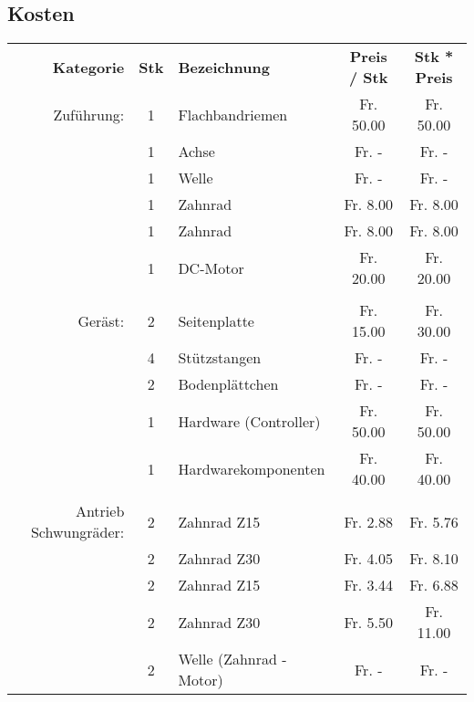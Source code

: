\subsection{Kosten}

\begin{table}[h!]

  \centering
 
    \begin{tabular}{rclcc}
    \textbf{Kategorie} & \textbf{Stk} & \textbf{Bezeichnung} & \textbf{Preis / Stk} & \textbf{Stk * Preis} \\

    Zuführung: & 1     & Flachbandriemen 	&  Fr. 50.00  &  Fr. 50.00  \\
               & 1     & Achse          	&  Fr. -      &  Fr. -    \\
               & 1     & Welle           	&  Fr. -      &  Fr. -    \\
               & 1     & Zahnrad         	&  Fr. 8.00   &  Fr. 8.00  \\
               & 1     & Zahnrad         	&  Fr. 8.00   &  Fr. 8.00  \\
               & 1     & DC-Motor        	&  Fr. 20.00  &  Fr. 20.00  \\
               &       &                 	&             &  \\
       Geräst: & 2     & Seitenplatte    	&  Fr. 15.00  &  Fr. 30.00  \\
               & 4     & Stützstangen    	&  Fr. -      &  Fr. -    \\
               & 2     & Bodenplättchen  	&  Fr. -      &  Fr. -    \\
               & 1     & Hardware (Controller) &  Fr. 50.00  &  Fr. 50.00  \\
               & 1     & Hardwarekomponenten&  Fr. 40.00  &  Fr. 40.00  \\
               &       &       				&      		  &  \\
Antrieb Schwungräder:  & 2    & Zahnrad Z15 &  Fr. 2.88   &  Fr. 5.76  \\
               & 2     & Zahnrad Z30 		&  Fr.          4.05  &  Fr. 8.10  \\
               & 2     & Zahnrad Z15 		&  Fr.          3.44  &  Fr. 6.88  \\
               & 2     & Zahnrad Z30 		&  Fr.          5.50  &  Fr. 11.00  \\
               & 2     & Welle (Zahnrad - Motor) &  Fr. -    &  Fr. -    \\

\end{tabular}
\end{table}
